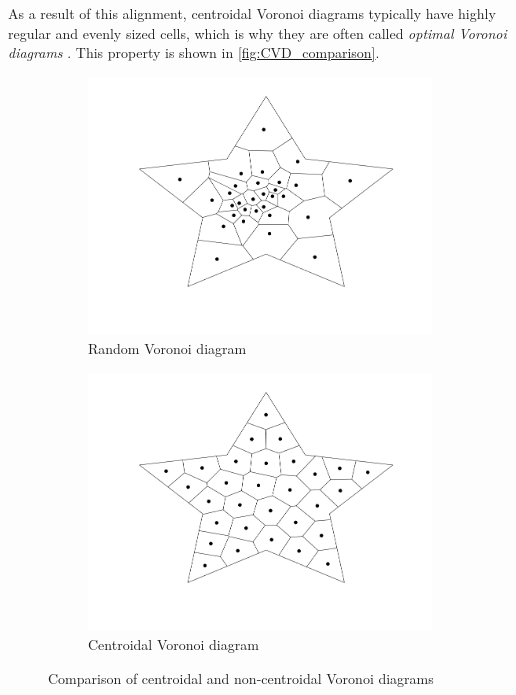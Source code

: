 As a result of this alignment, centroidal Voronoi diagrams typically have highly regular and evenly sized cells, which is why they are often called \emph{optimal Voronoi diagrams} \cite{UPR_thesis}. This property is shown in \autoref{fig:CVD_comparison}.

\begin{figure}[ht]
    \centering
    \begin{subfigure}[b]{0.4\textwidth}
        \centering
        \includegraphics[width=\textwidth]{report/Images/Theory/voronoi/centroidal_voronoi_diagram_0.png}
        \caption{Random Voronoi diagram}
        \label{fig:notCVD}
    \end{subfigure}
    \begin{subfigure}[b]{0.4\textwidth}
        \centering
        \includegraphics[width=\textwidth]{report/Images/Theory/voronoi/centroidal_voronoi_diagram.png}
        \caption{Centroidal Voronoi diagram}
        \label{fig:CVD}
    \end{subfigure}
    \caption{Comparison of centroidal and non-centroidal Voronoi diagrams}
    \label{fig:CVD_comparison}
\end{figure}

